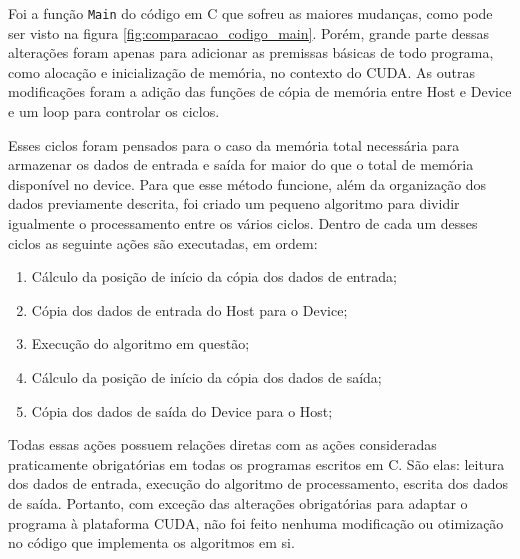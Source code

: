 Foi a função \texttt{Main} do código em C que sofreu as maiores mudanças, como pode ser visto na figura \ref{fig:comparacao_codigo_main}. Porém, grande parte dessas alterações foram apenas para adicionar as premissas básicas de todo programa, como alocação e inicialização de memória, no contexto do CUDA. As outras modificações foram a adição das funções de cópia de memória entre Host e Device e um loop para controlar os ciclos.

Esses ciclos foram pensados para o caso da memória total necessária para armazenar os dados de entrada e saída for maior do que o total de memória disponível no device. Para que esse método funcione, além da organização dos dados previamente descrita, foi criado um pequeno algoritmo para dividir igualmente o processamento entre os vários ciclos. Dentro de cada um desses ciclos as seguinte ações são executadas, em ordem:

\begin{enumerate}
\item Cálculo da posição de início da cópia dos dados de entrada;
\item Cópia dos dados de entrada do Host para o Device;
\item Execução do algoritmo em questão;
\item Cálculo da posição de início da cópia dos dados de saída;
\item Cópia dos dados de saída do Device para o Host;
\end{enumerate}

Todas essas ações possuem relações diretas com as ações consideradas praticamente obrigatórias em todas os programas escritos em C. São elas: leitura dos dados de entrada, execução do algoritmo de processamento, escrita dos dados de saída. Portanto, com exceção das alterações obrigatórias para adaptar o programa à plataforma CUDA, não foi feito nenhuma modificação ou otimização no código que implementa os algoritmos em si.

